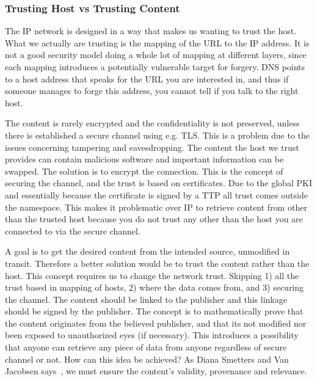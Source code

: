 
\subsubsection{Trusting Host vs Trusting Content}
The \gls{IP} network is designed in a way that makes us wanting to trust the host.
What we actually are trusting is the mapping of the \gls{URL} to the \gls{IP} address.
It is not a good security model doing a whole lot of mapping at different layers, since each mapping introduces a potentially vulnerable target for forgery.
\gls{DNS} points to a host address that speaks for the \gls{URL} you are interested in, and thus if someone manages to forge this address, you cannot tell if you talk to the right host.

The content is rarely encrypted and the confidentiality is not preserved, unless there is established a secure channel using e.g. \gls{TLS}.
This is a problem due to the issues concerning tampering and eavesdropping.
The content the host we trust provides can contain malicious software and important information can be swapped. 
The solution is to encrypt the connection. 
This is the concept of securing the channel, and the trust is based on certificates.
Due to the global \gls{PKI} and essentially because the certificate is signed by a \gls{TTP} all trust comes outside the namespace.
This makes it problematic over \gls{IP} to retrieve content from other than the trusted host because you do not trust any other than the host you are connected to via the secure channel.

A goal is to get the desired content from the intended source, unmodified in transit.
Therefore a better solution would be to trust the content rather than the host.
This concept requires us to change the network trust.
Skipping 1) all the trust based in mapping of hosts, 2) where the data comes from, and 3) securing the channel.
The content should be linked to the publisher and this linkage should be signed by the publisher. 
The concept is to mathematically prove that the content originates from the believed publisher, and that its not modified nor been exposed to unauthorized eyes (if necessary).
This introduces a possibility that anyone can retrieve any piece of data from anyone regardless of secure channel or not.
How can this idea be achieved? 
As Diana Smetters and Van Jacobsen says~\cite{secure-network-content}, we must ensure the content's validity, provenance and relevance.

